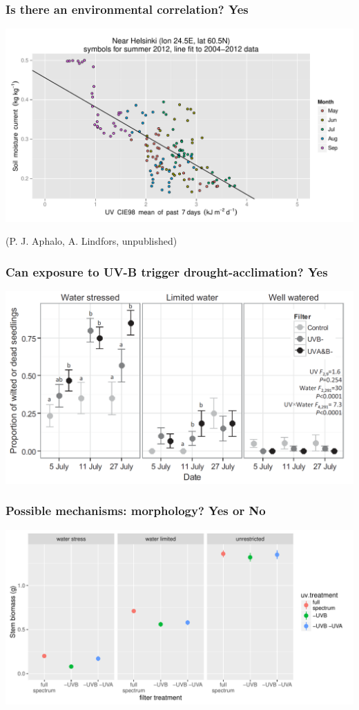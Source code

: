 \documentclass[10pt]{beamer}\usepackage[]{graphicx}\usepackage[]{color}
\newenvironment{knitrout}{}{} %
\begin{document}
\begin{frame}
  \frametitle{Is there an environmental correlation? Yes}
  \includegraphics[width=\linewidth]{figures/soil-CIEmean.pdf}

  (P. J. Aphalo, A. Lindfors, unpublished)
\end{frame}

\begin{frame}
  \frametitle{Can exposure to UV-B trigger drought-acclimation? Yes}
  \includegraphics[width=\linewidth]{figures/birch-wilt.png}

  \autocite{Robson2014}
\end{frame}

\begin{frame}[fragile]
  \frametitle{Possible mechanisms: morphology? Yes or No}
\begin{knitrout}\scriptsize
{}\color{fgcolor}

{\centering \includegraphics[width=.95\textwidth]{figure/pos-biomass-1} 

}



\end{knitrout}
\end{frame}
\end{document}
